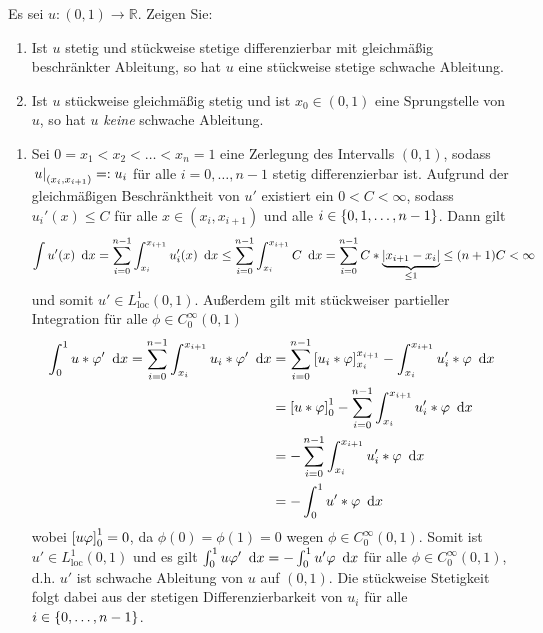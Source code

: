 \begin{exercisePage}
	
	\setcounter{taskcount}{27}
	
	\begin{task}
		Es sei $u\colon (0,1) \to \mathbb R$. Zeigen Sie:
		\begin{enumerate}
			\item Ist $u$ stetig und stückweise stetige differenzierbar mit gleichmäßig beschränkter Ableitung, so hat $u$ eine stückweise stetige schwache Ableitung.
			\item Ist $u$ stückweise gleichmäßig stetig und ist $x_0 \in (0,1)$ eine Sprungstelle von $u$, so hat $u$ \textit{keine} schwache Ableitung.
		\end{enumerate} 
	\end{task}
	
	\begin{enumerate}[label=(zu \alph*), leftmargin=*]
		\item Sei $0 = x_1 < x_2 < \dots < x_n = 1$ eine Zerlegung des Intervalls $(0,1)$, sodass $\left. u \right\vert_{(x_i, x_{i+1})} \mathrel{=:} u_i$ für alle $i = 0, \dots, n-1$ stetig differenzierbar ist. Aufgrund der gleichmäßigen Beschränktheit von $u'$ existiert ein $0 < C < \infty$, sodass $u_i'(x) \le C$ für alle $x \in (x_i, x_{i+1})$ und alle $i \in \left\{ 0, 1, \dots, n-1 \right\}$. Dann gilt
		\begin{equation*}
			\int u'(x) \enskip \mathrm{d}x = \sum_{i=0}^{n-1} \int_{x_i}^{x_{i+1}} u_i'(x) \enskip \mathrm{d}x \le \sum_{i=0}^{n-1} \int_{x_i}^{x_{i+1}} C \enskip \mathrm{d}x = \sum_{i=0}^{n-1} C * \underbrace{\left| x_{i+1} - x_i \right|}_{\le 1} \le (n+1) C < \infty
		\end{equation*}
		und somit $u' \in L^1_{\text{loc}}(0,1)$. Außerdem gilt mit stückweiser partieller Integration für alle $\phi \in C_0^\infty(0,1)$
		\begin{equation*}
			\begin{aligned}
				\int_0^1 u * \varphi' \enskip \mathrm{d}x 
				= \sum_{i=0}^{n-1} \int_{x_i}^{x_{i+1}} u_i * \varphi' \enskip \mathrm{d}x 
				&= \sum_{i=0}^{n-1} \left[ u_i * \varphi \right]_{x_i}^{x_{i+1}} - \int_{x_i}^{x_{i+1}} u_i' * \varphi \enskip \mathrm{d}x \\
				&= \left[ u * \varphi \right]_0^1 - \sum_{i=0}^{n-1} \int_{x_i}^{x_{i+1}} u_i' * \varphi \enskip \mathrm{d}x \\ 
				&= - \sum_{i=0}^{n-1} \int_{x_i}^{x_{i+1}} u_i' * \varphi \enskip \mathrm{d}x \\
				&= - \int_0^1 u' * \varphi \enskip \mathrm{d}x
			\end{aligned}
		\end{equation*}
		wobei $\left[ u \varphi \right]_0^1 = 0$, da $\phi(0) = \phi(1) = 0$ wegen $\phi \in C_0^\infty(0,1)$.
		Somit ist $u' \in L_{\text{loc}}^1(0,1)$ und es gilt $\int_0^1 u \varphi' \enskip \mathrm{d}x = - \int_0^1 u' \varphi \enskip \mathrm{d}x$ für alle $\phi \in C_0^\infty(0,1)$, d.h. $u'$ ist schwache Ableitung von $u$ auf $(0,1)$. Die stückweise Stetigkeit folgt dabei aus der stetigen Differenzierbarkeit von $u_i$ für alle $i \in \left\{ 0, \dots, n-1 \right\}$.
	\end{enumerate}



\end{exercisePage}
